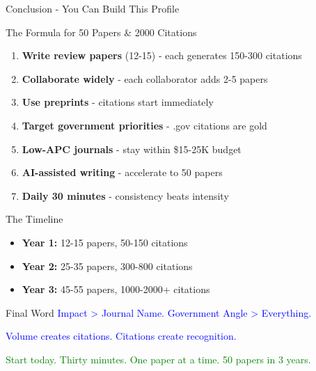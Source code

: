 \documentclass[11pt]{beamer}
\begin{document}
	\begin{frame}{Conclusion - You Can Build This Profile}
		\scriptsize
		\begin{block}{The Formula for 50 Papers \& 2000 Citations}
			\begin{enumerate}
				\item \textbf{Write review papers} (12-15) - each generates 150-300 citations
				\item \textbf{Collaborate widely} - each collaborator adds 2-5 papers
				\item \textbf{Use preprints} - citations start immediately
				\item \textbf{Target government priorities} - .gov citations are gold
				\item \textbf{Low-APC journals} - stay within \$15-25K budget
				\item \textbf{AI-assisted writing} - accelerate to 50 papers
				\item \textbf{Daily 30 minutes} - consistency beats intensity
			\end{enumerate}
		\end{block}
		\begin{block}{The Timeline}
			\begin{itemize}
				\item \textbf{Year 1:} 12-15 papers, 50-150 citations
				\item \textbf{Year 2:} 25-35 papers, 300-800 citations
				\item \textbf{Year 3:} 45-55 papers, 1000-2000+ citations
			\end{itemize}
		\end{block}
		\begin{block}{Final Word}
			\textcolor{blue}{Impact > Journal Name. Government Angle > Everything.}
			
			\textcolor{blue}{Volume creates citations. Citations create recognition.}
			
			\textcolor{green}{Start today. Thirty minutes. One paper at a time. 50 papers in 3 years.}
		\end{block}
	\end{frame}
	
\end{document}
